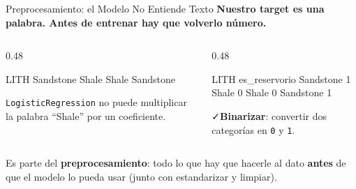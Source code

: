 \documentclass[aspectratio=169, 11pt]{beamer}
\begin{document}
\begin{frame}[fragile,shrink=15]{Preprocesamiento: el Modelo No Entiende Texto}
  \vspace{-4pt}
  {\small\color{arcaDark}\bfseries
    Nuestro target es una \textbf{palabra}. Antes de entrenar hay que volverlo número.}

  \vspace{4pt}
  \begin{columns}[T]
    \begin{column}{0.48\textwidth}
      \begin{outputblock}[title={\small\faTable\hspace{6pt}como viene el dato}]
LITH
Sandstone
Shale
Shale
Sandstone
      \end{outputblock}
      \vspace{3pt}
      {\scriptsize\color{arcaRed}
        \faTimes\hspace{3pt}\texttt{LogisticRegression} no puede
        multiplicar la palabra ``Shale'' por un coeficiente.}
    \end{column}
    \begin{column}{0.48\textwidth}
      \begin{outputblock}[title={\small\faCheck\hspace{6pt}como lo necesitamos}]
LITH        es_reservorio
Sandstone   1
Shale       0
Shale       0
Sandstone   1
      \end{outputblock}
      \vspace{3pt}
      {\scriptsize\color{codeGreen}
        \faCheck\hspace{3pt}\textbf{Binarizar}: convertir dos
        categorías en \texttt{0} y \texttt{1}.}
    \end{column}
  \end{columns}

  \vspace{5pt}
  {\scriptsize\color{textMuted}
    \faLightbulb[regular]\hspace{3pt}%
    Es parte del \textbf{preprocesamiento}: todo lo que hay que hacerle al dato
    \textbf{antes} de que el modelo lo pueda usar (junto con estandarizar y limpiar).}
\end{frame}
\end{document}
